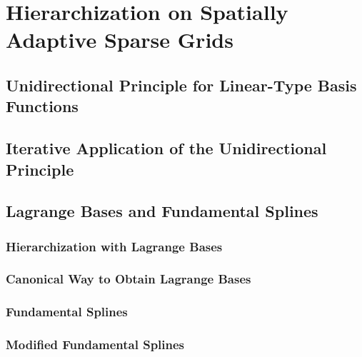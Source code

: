 \section{Hierarchization on Spatially Adaptive Sparse Grids}
\label{sec:44spatAdaptive}

\blindtext{}



\subsection{Unidirectional Principle for Linear-Type Basis Functions}
\label{sec:441linearType}

\blindtext{}



\subsection{Iterative Application of the Unidirectional Principle}
\label{sec:442iterativeUnidirectionalPrinciple}

\blindtext{}



\subsection{Lagrange Bases and Fundamental Splines}
\label{sec:443fundamentalSplines}

\blindtext{}

\subsubsection{Hierarchization with Lagrange Bases}

\blindtext{}

\subsubsection{Canonical Way to Obtain Lagrange Bases}

\blindtext{}

\subsubsection{Fundamental Splines}

\blindtext{}

\subsubsection{Modified Fundamental Splines}

